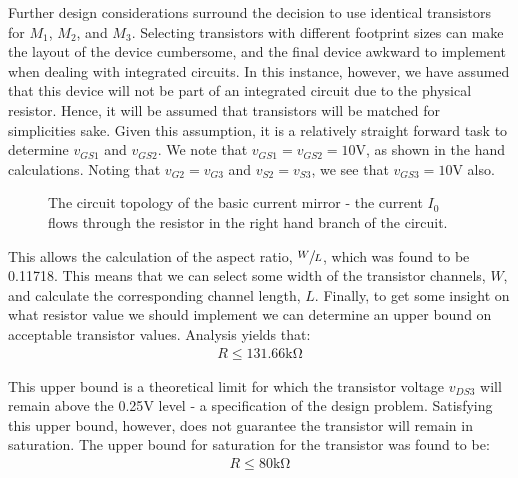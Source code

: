 \documentclass{article}
\begin{document}
Further design considerations surround the decision to use identical transistors for $M_1$, $M_2$, and $M_3$. Selecting transistors with different footprint sizes can make the layout of the device cumbersome, and the final device awkward to implement when dealing with integrated circuits. In this instance, however, we have assumed that this device will not be part of an integrated circuit due to the physical resistor. Hence, it will be assumed that transistors will be matched for simplicities sake. Given this assumption, it is a relatively straight forward task to determine $v_{GS1}$ and $v_{GS2}$. We note that $v_{GS1} = v_{GS2} = 10\si{\volt}$, as shown in the hand calculations. Noting that $v_{G2} = v_{G3}$ and $v_{S2} = v_{S3}$, we see that $v_{GS3} = 10\si{\volt}$ also.

\begin{figure}[H]
	\centering
\caption{The circuit topology of the basic current mirror - the current $I_0$ flows through the resistor in the right hand branch of the circuit.}
\end{figure}

This allows the calculation of the aspect ratio, $\sfrac{W}{L}$, which was found to be 0.11718. This means that we can select some width of the transistor channels, $W$, and calculate the corresponding channel length, $L$. Finally, to get some insight on what resistor value we should implement we can determine an upper bound on acceptable transistor values. Analysis yields that:
\begin{align*}
	R \leq 131.66 \si{\kilo\ohm}
\end{align*}

This upper bound is a theoretical limit for which the transistor voltage $v_{DS3}$ will remain above the 0.25$\si{\volt}$ level - a specification of the design problem. Satisfying this upper bound, however, does not guarantee the transistor will remain in saturation. The upper bound for saturation for the transistor was found to be:
\begin{align*}
	R \leq 80 \si{\kilo\ohm}
\end{align*}  
\end{document}
